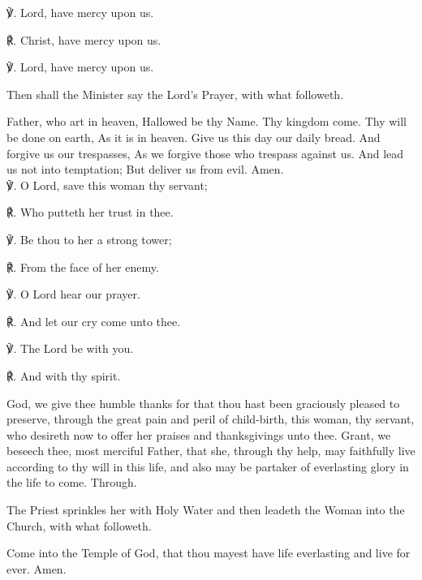℣. Lord, have mercy upon us.

℟. Christ, have mercy upon us.

℣. Lord, have mercy upon us.

\clearpage
\begin{rubric}
	 Then shall the Minister say the Lord's Prayer, with what followeth.
\end{rubric}

 Father, who art in heaven, Hallowed be thy Name. Thy kingdom come. Thy will be done on earth, As it is in heaven. Give us this day our daily bread. And forgive us our trespasses, As we forgive those who trespass against us. And lead us not into temptation; But deliver us from evil. Amen.\\

	℣. O Lord, save this woman thy servant;\par
    ℟. Who putteth her trust in thee.\par
    ℣. Be thou to her a strong tower;\par
    ℟. From the face of her enemy.\par
    ℣. O Lord hear our prayer.\par
    ℟. And let our cry come unto thee.\par
    ℣. The Lord be with you.\par
    ℟. And with thy spirit.\par
    
     God, we give thee humble thanks for that thou hast been graciously pleased to preserve, through the great pain and peril of child-birth, this woman, thy servant, who desireth now to offer her praises and thanksgivings unto thee. Grant, we beseech thee, most merciful Father, that she, through thy help, may faithfully live according to thy will in this life, and also may be partaker of everlasting glory in the life to come. Through.
    
    \begin{rubric}
    	The Priest sprinkles her with Holy Water and then leadeth the Woman into the Church, with what followeth.
    \end{rubric}\par\noindent
    Come into the Temple of God, that thou mayest have life everlasting and live for ever. Amen.